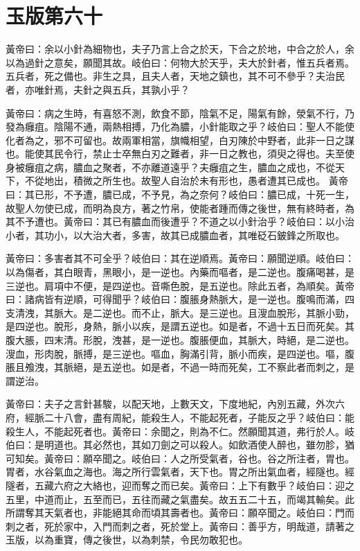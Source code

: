 \section{玉版第六十}

黃帝曰：余以小針為細物也，夫子乃言上合之於天，下合之於地，中合之於人，余以為過針之意矣，願聞其故。岐伯曰：何物大於天乎，夫大於針者，惟五兵者焉。五兵者，死之備也。非生之具，且夫人者，天地之鎮也，其不可不參乎？夫治民者，亦唯針焉，夫針之與五兵，其孰小乎？

黃帝曰：病之生時，有喜怒不測，飲食不節，陰氣不足，陽氣有餘，滎氣不行，乃發為癰疽。陰陽不通，兩熱相搏，乃化為膿，小針能取之乎？岐伯曰：聖人不能使化者為之，邪不可留也。故兩軍相當，旗幟相望，白刃陳於中野者，此非一日之謀也。能使其民令行，禁止士卒無白刃之難者，非一日之教也，須臾之得也。夫至使身被癰疽之病，膿血之聚者，不亦離道遠乎？夫癰疽之生，膿血之成也，不從天下，不從地出，積微之所生也。故聖人自治於未有形也，愚者遭其已成也。
黃帝曰：其已形，不予遭，膿已成，不予見，為之奈何？岐伯曰：膿已成，十死一生，故聖人勿使已成，而明為良方，著之竹帛，使能者踵而傳之後世，無有終時者，為其不予遭也。黃帝曰：其已有膿血而後遭乎？不道之以小針治乎？岐伯曰：以小治小者，其功小，以大治大者，多害，故其已成膿血者，其唯砭石鈹鋒之所取也。

黃帝曰：多害者其不可全乎？岐伯曰：其在逆順焉。黃帝曰：願聞逆順。岐伯曰：以為傷者，其白眼青，黑眼小，是一逆也。內藥而嘔者，是二逆也。腹痛喝甚，是三逆也。肩項中不便，是四逆也。音嘶色脫，是五逆也。除此五者，為順矣。黃帝曰：諸病皆有逆順，可得聞乎？岐伯曰：腹脹身熱脈大，是一逆也。腹鳴而滿，四支清洩，其脈大。是二逆也。而不止，脈大。是三逆也。且溲血脫形，其脈小勁，是四逆也。脫形，身熱，脈小以疾，是謂五逆也。如是者，不過十五日而死矣。其腹大脹，四末清。形脫，洩甚，是一逆也。腹脹便血，其脈大，時絕，是二逆也。溲血，形肉脫，脈搏，是三逆也。嘔血，胸滿引背，脈小而疾，是四逆也。嘔，腹脹且飧洩，其脈絕，是五逆也。如是者，不過一時而死矣，工不察此者而刺之，是謂逆治。

黃帝曰：夫子之言針甚駿，以配天地，上數天文，下度地紀，內別五藏，外次六府，經脈二十八會，盡有周紀，能殺生人，不能起死者，子能反之乎？岐伯曰：能殺生人，不能起死者也。黃帝曰：余聞之，則為不仁。然願聞其道，弗行於人。岐伯曰：是明道也。其必然也，其如刀劍之可以殺人。如飲酒使人醉也，雖勿胗，猶可知矣。黃帝曰：願卒聞之。岐伯曰：人之所受氣者，谷也。谷之所注者，胃也。胃者，水谷氣血之海也。海之所行雲氣者，天下也。胃之所出氣血者，經隧也。經隧者，五藏六府之大絡也，迎而奪之而已矣。黃帝曰：上下有數乎？岐伯曰：迎之五里，中道而止，五至而已，五往而藏之氣盡矣。故五五二十五，而竭其輸矣。此所謂奪其天氣者也，非能絕其命而頃其壽者也。黃帝曰：願卒聞之。岐伯曰：門而刺之者，死於家中，入門而刺之者，死於堂上。黃帝曰：善乎方，明哉道，請著之玉版，以為重寶，傳之後世，以為刺禁，令民勿敢犯也。



